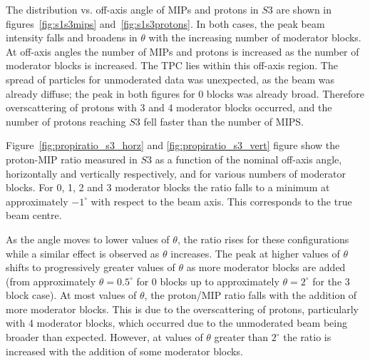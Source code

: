 The distribution vs. off-axis angle of MIPs and protons in $\mathit{S3}$ are shown in figures~\ref{fig:s1s3mips} and~\ref{fig:s1s3protons}.
In both cases, the peak beam intensity falls and broadens in $\theta$ with the increasing number of moderator blocks. 
At off-axis angles the number of MIPs and protons is increased as the number of moderator blocks is increased.
The TPC lies within this off-axis region.
The spread of particles for unmoderated data was unexpected, as the beam was already diffuse; the peak in both figures for 0 blocks was already broad.
Therefore overscattering of protons with 3 and 4 moderator blocks occurred, and the number of protons reaching $\mathit{S3}$ fell faster than the number of MIPS.

Figure~\ref{fig:propiratio_s3_horz} and \ref{fig:propiratio_s3_vert} figure show the proton-MIP ratio measured in $\mathit{S3}$ as a function of the nominal off-axis angle, horizontally and vertically respectively, and for various numbers of moderator blocks.
For 0, 1, 2 and 3 moderator blocks the ratio falls to a minimum at approximately $-1^{\circ}$ with respect to the beam axis.
This corresponds to the true beam centre.

As the angle moves to lower values of $\theta$, the ratio rises for these configurations while a similar effect is observed as $\theta$ increases.
The peak at higher values of $\theta$ shifts to progressively greater values of $\theta$ as more moderator blocks are added (from approximately $\theta = 0.5^{\circ}$ for 0 blocks up to approximately $\theta = 2^{\circ}$ for the 3 block case).
At most values of $\theta$, the proton/MIP ratio falls with the addition of more moderator blocks. 
This is due to the overscattering of protons, particularly with 4 moderator blocks, which occurred due to the unmoderated beam being broader than expected.
However, at values of $\theta$ greater than $2^{\circ}$ the ratio is increased with the addition of some moderator blocks.

